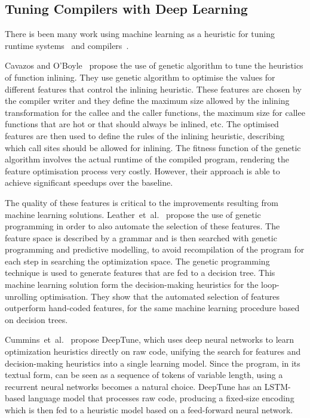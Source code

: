 \subsection{Tuning Compilers with Deep Learning}

There is been many work using machine learning as a heuristic for tuning runtime systems~\cite{andreasson02,wang09,castro11,rocha17,pereira17} and compilers~\cite{cavazos05,leather09,cummins17,wang18,mendis19}.

Cavazos and O'Boyle~\cite{cavazos05} propose the use of genetic algorithm to tune the heuristics of function inlining.
They use genetic algorithm to optimise the values for different features that control the inlining heuristic.
These features are chosen by the compiler writer and they define the maximum size allowed by the inlining transformation for the callee and the caller functions, the maximum size for callee functions that are hot or that should always be inlined, etc.
The optimised features are then used to define the rules of the inlining heuristic, describing which call sites should be allowed for inlining.
The fitness function of the genetic algorithm involves the actual runtime of the compiled program, rendering the feature optimisation process very costly.
However, their approach is able to achieve significant speedups over the baseline.

The quality of these features is critical to the improvements resulting from machine learning solutions.
Leather~et~al.~\cite{leather09} propose the use of genetic programming in order to also automate the selection of these features.
The feature space is described by a grammar and is then searched with genetic programming and predictive modelling, to avoid recompilation of the program for each step in searching the optimization space.
The genetic programming technique is used to generate features that are fed to a decision tree.
This machine learning solution form the decision-making heuristics for the loop-unrolling optimisation.
They show that the automated selection of features outperform hand-coded features, for the same machine learning procedure based on decision trees.

Cummins~et~al.~\cite{cummins17} propose DeepTune, which uses deep neural networks to learn optimization heuristics directly on raw code, unifying the search for features and decision-making heuristics into a single learning model.
Since the program, in its textual form, can be seen as a sequence of tokens of variable length, using a recurrent neural networks becomes a natural choice.
DeepTune has an LSTM-based language model that processes raw code, producing a fixed-size encoding which is then fed to a heuristic model based on a feed-forward neural network.

